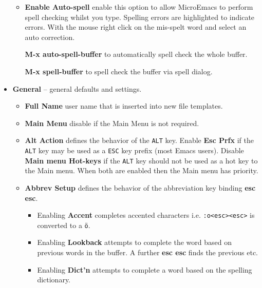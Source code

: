 \documentclass[11pt,a4paper,pdftex]{article}
\begin{document}
\begin{itemize}
\begin{itemize}
      \item \textbf{Enable Auto-spell} enable this option to allow MicroEmacs
      to perform spell checking whilst you type. Spelling errors are
      highlighted to indicate errors. With the mouse right click on the
      mis-spelt word and select an auto correction.

      \textbf{M-x auto-spell-buffer} to automatically spell check the
      whole buffer.

      \textbf{M-x spell-buffer} to spell check the buffer via spell dialog.

    \end{itemize}

    \item \textbf{General} -- general defaults and settings.

    \begin{itemize}

      \item \textbf{Full Name} user name that is inserted into new file
      templates.

      \item \textbf{Main Menu} disable if the Main Menu is not required.

      \item \textbf{Alt Action} defines the behavior of the \texttt{ALT} key.
      Enable \textbf{Esc Prfx} if the \texttt{ALT} key may be used as a
      \texttt{ESC} key prefix (most Emacs users). Disable \textbf{Main menu
      Hot-keys} if the \texttt{ALT} key should not be used as a hot key to the
      Main menu. When both are enabled then the Main menu has priority.

      \item \textbf{Abbrev Setup} defines the behavior of the abbreviation key
      binding \textbf{esc esc}.

      \begin{itemize}

        \item Enabling \textbf{Accent} completes accented characters i.e.
        \texttt{:o<esc><esc>} is converted to a \texttt{\"{o}}.

        \item Enabling \textbf{Lookback} attempts to complete the word based
        on previous words in the buffer. A further \textbf{esc esc} finds the
        previous etc.

        \item Enabling \textbf{Dict'n} attempts to complete a word based on
        the spelling dictionary.


\end{itemize}
\end{itemize}
\end{itemize}
\end{document}

